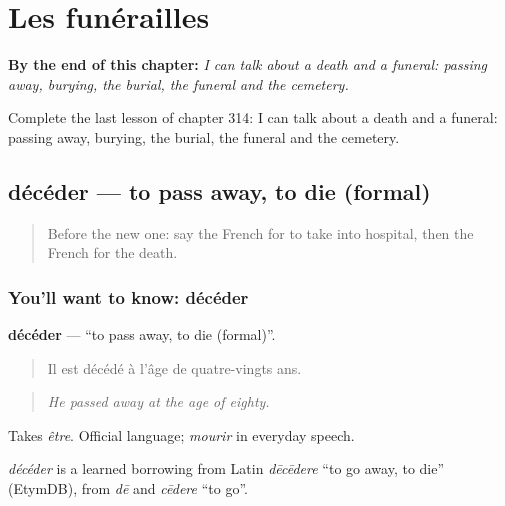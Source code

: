 
\chapter{Les funérailles}
\label{ch:fr-les-funerailles}

\begin{chapteropening}
\textbf{By the end of this chapter:} \emph{I can talk about a death and a funeral: passing away, burying, the burial, the funeral and the cemetery.}

Complete the last lesson of chapter 314: I can talk about a death and a funeral: passing away, burying, the burial, the funeral and the cemetery.
\end{chapteropening}

\section[décéder]{décéder — to pass away, to die (formal)}

\label{lesson:FR-C314-deceder}



\begin{quote}
Before the new one: say the French for to take into hospital, then the French for the death.
\end{quote}

\subsection*{You'll want to know: décéder}
\textbf{décéder} — \textquotedblleft{}to pass away, to die (formal)\textquotedblright{}.

\begin{quote}
Il est décédé à l'âge de quatre-vingts ans.
\end{quote}

\begin{quote}
\emph{He passed away at the age of eighty.}
\end{quote}

Takes \emph{être}. Official language; \emph{mourir} in everyday speech.

\begin{cousinweb}
\emph{décéder} is a learned borrowing from Latin \emph{dēcēdere} \textquotedblleft{}to go away, to die\textquotedblright{} (EtymDB), from \emph{dē} and \emph{cēdere} \textquotedblleft{}to go\textquotedblright{}.
\end{cousinweb}


